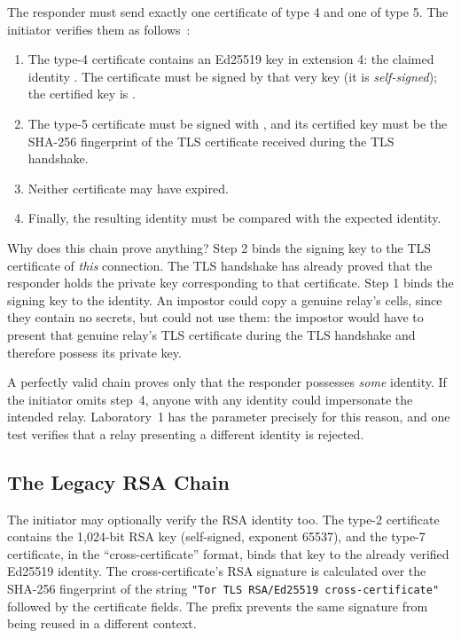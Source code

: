 The responder must send exactly one certificate of type 4 and one of type 5. The initiator verifies them as follows~:
\begin{enumerate}
  \item The type-4 certificate contains an Ed25519 key in extension 4: the claimed identity . The certificate must be signed by that very key (it is \emph{self-signed}); the certified key is .
  \item The type-5 certificate must be signed with , and its certified key must be the SHA-256 fingerprint of the TLS certificate received during the TLS handshake.
  \item Neither certificate may have expired.
  \item Finally, the resulting identity must be compared with the expected identity.
\end{enumerate}

Why does this chain prove anything? Step 2 binds the signing key to the TLS certificate of \emph{this} connection. The TLS handshake has already proved that the responder holds the private key corresponding to that certificate. Step 1 binds the signing key to the identity. An impostor could copy a genuine relay's  cells, since they contain no secrets, but could not use them: the impostor would have to present that genuine relay's TLS certificate during the TLS handshake and therefore possess its private key.

\begin{attenzione}
A perfectly valid chain proves only that the responder possesses \emph{some} identity. If the initiator omits step~4, anyone with any identity could impersonate the intended relay. Laboratory~1 has the  parameter precisely for this reason, and one test verifies that a relay presenting a different identity is rejected.
\end{attenzione}

\subsection{The Legacy RSA Chain}

The initiator may optionally verify the RSA identity too. The type-2 certificate contains the 1,024-bit RSA key (self-signed, exponent 65537), and the type-7 certificate, in the \enquote{cross-certificate} format, binds that key to the already verified Ed25519 identity. The cross-certificate's RSA signature is calculated over the SHA-256 fingerprint of the string \texttt{"Tor TLS RSA/Ed25519 cross-certificate"} followed by the certificate fields. The prefix prevents the same signature from being reused in a different context.

